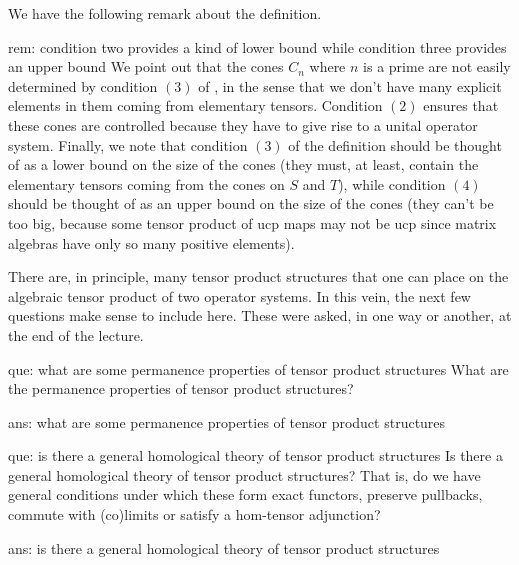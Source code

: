 \documentclass[main.tex]{subfiles}
\begin{document}
We have the following remark about the definition.

\begin{remark}{}{rem: condition two provides a kind of lower bound while condition three provides an upper bound}
We point out that the cones $C_n$ where $n$ is a prime are not easily determined by condition $(3)$ of , in the sense that we don't have many explicit elements in them coming from elementary tensors.  Condition $(2)$ ensures that these cones are controlled because they have to give rise to a unital operator system. Finally, we note that condition $(3)$ of the definition should be thought of as a lower bound on the size of the cones (they must, at least, contain the elementary tensors coming from the cones on $S$ and $T$), while condition $(4)$ should be thought of as an upper bound on the size of the cones (they can't be too big, because some tensor product of ucp maps may not be ucp since matrix algebras have only so many positive elements). 
\end{remark}

There are, in principle, many tensor product structures that one can place on the algebraic tensor product of two operator systems. In this vein, the next few questions make sense to include here. These were asked, in one way or another, at the end of the lecture. 

\begin{Question}{}{que: what are some permanence properties of tensor product structures}
What are the permanence properties of tensor product structures? 
\end{Question}
\begin{Answer}{}{ans: what are some permanence properties of tensor product structures}

\end{Answer}

\begin{Question}{}{que: is there a general homological theory of tensor product structures}
Is there a general homological theory of tensor product structures? That is, do we have general conditions under which these form exact functors, preserve pullbacks, commute with (co)limits or satisfy a hom-tensor adjunction?
\end{Question}
\begin{Answer}{}{ans: is there a general homological theory of tensor product structures}

\end{Answer}
\end{document}

